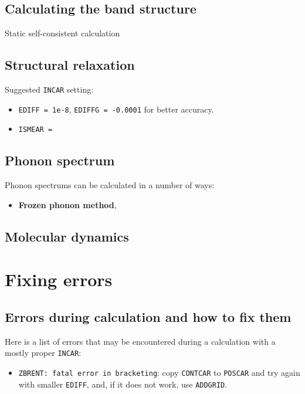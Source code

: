 \documentclass[hyperref, a4paper]{article}
\newcommand*{\concept}[1]{{\textbf{#1}}}
\begin{document}
\subsection{Calculating the band structure}

Static self-consistent calculation

\subsection{Structural relaxation}

Suggested \texttt{INCAR} setting: 
\begin{itemize}
    \item \texttt{EDIFF = 1e-8}, \texttt{EDIFFG = -0.0001} for better accuracy.
    \item \texttt{ISMEAR = }
\end{itemize}

\subsection{Phonon spectrum}

Phonon spectrums can be calculated in a number of ways:
\begin{itemize}
    \item \concept{Frozen phonon method}, 
\end{itemize}

\subsection{Molecular dynamics}

\section{Fixing errors}

\subsection{Errors during calculation and how to fix them}

Here is a list of errors that may be encountered during a calculation with a mostly proper \texttt{INCAR}:
\begin{itemize}
    \item \texttt{ZBRENT: fatal error in bracketing}: copy \texttt{CONTCAR} to \texttt{POSCAR} and try again with smaller \texttt{EDIFF}, and, if it does not work, use \texttt{ADDGRID}.
\end{itemize}
\end{document}
